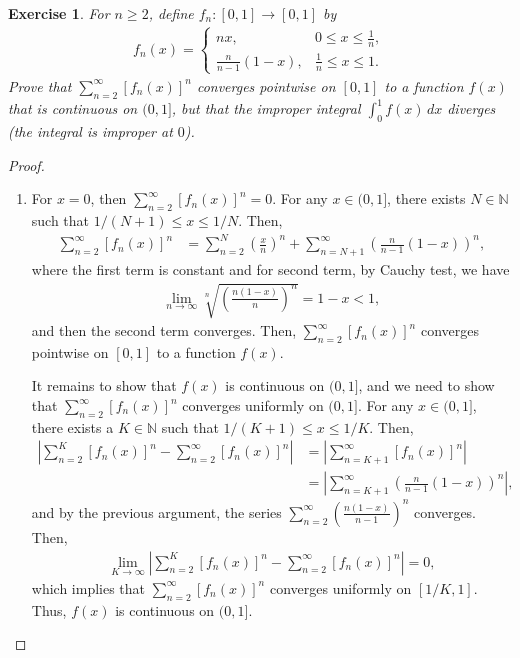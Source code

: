 \documentclass[11pt]{article}
\newtheorem{exercise}{Exercise}[section]
\theoremstyle{definition}
\numberwithin{equation}{subsection}
\begin{document}
\begin{exercise}{\rm *}
For $n \geq 2$, define $f_n: [0,1] \to [0,1]$ by
\begin{align*}
    f_n(x) = \begin{cases}
        nx, & 0   \leq x \leq \frac{1}{n}, \\
          \frac{n}{n-1}(1 - x), &   \frac{1}{n} \leq x \leq 1.
    \end{cases}
\end{align*}
Prove that $  \sum^\infty_{n=2} [f_n(x)]^n$ converges pointwise on $[0,1]$ to a function $f(x)$ that is continuous on $(0,1]$, but that the improper integral $\displaystyle \int^1_0 f(x)\, dx$ diverges (the integral is improper at $0$). 
\end{exercise}
\begin{proof}
~\begin{enumerate}[label=(\alph*)]
    \item For $x = 0$, then $  \sum^\infty_{n=2} [f_n(x)]^n = 0$. For any $x \in (0,1]$, there exists $N \in \mathbb{N}$ such that $1 / (N+1) \leq x \leq 1 / N$. Then,
    \begin{align*}
        \sum^\infty_{n=2} [f_n(x)]^n & = \sum^N_{n = 2} \left( \frac{x}{n} \right)^n + \sum^\infty_{n=N+1} \left( \frac{n}{n - 1} (1-x) \right)^n,
    \end{align*}
    where the first term is constant and for second term, by Cauchy test, we have
    \begin{align*}
        \lim_{n \to \infty} \sqrt[n]{\left( \frac{n(1 - x)}{n} \right)^n} = 1 - x < 1,
    \end{align*}
    and then the second term converges. Then, $  \sum^\infty_{n=2} [f_n(x)]^n$ converges pointwise on $[0,1]$ to a function $f(x)$.
    
    It remains to show that $f(x)$ is continuous on $(0,1]$, and we need to show that $  \sum^\infty_{n=2} [f_n(x)]^n$ converges uniformly on $(0,1]$. For any $x \in (0,1]$, there exists a $K \in \mathbb{N}$ such that $1 / (K+1) \leq x \leq 1 / K$. Then, 
    \begin{align*}
        \left| \sum^K_{n=2} [f_n(x)]^n - \sum^\infty_{n=2} [f_n(x)]^n \right| & = \left| \sum^\infty_{n=K+1} [f_n(x)]^n\right| \\
        & = \left| \sum^\infty_{n=K+1} \left( \frac{n}{n - 1} (1-x) \right)^n \right|,
    \end{align*}
    and by the previous argument, the series $  \sum^\infty_{n=2} \left(\frac{n(1-x)}{n-1}\right)^n$ converges. Then, 
    \begin{align*}
        \lim_{K \to \infty} \left| \sum^K_{n=2} [f_n(x)]^n - \sum^\infty_{n=2} [f_n(x)]^n \right| = 0,
    \end{align*}
    which implies that $  \sum^\infty_{n=2} [f_n(x)]^n$ converges uniformly on $[1/K, 1]$. Thus, $f(x)$ is continuous on $(0,1]$.
    

\end{enumerate}
\end{proof}
\end{document}
